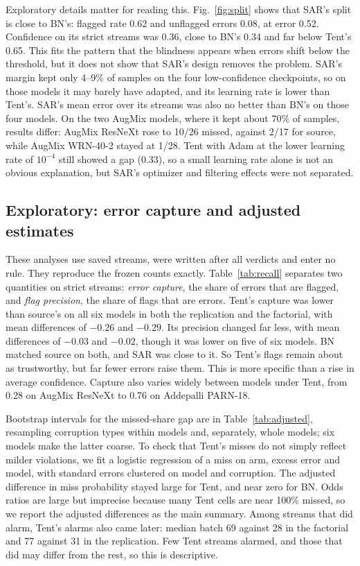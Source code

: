 \documentclass[runningheads]{llncs}
\begin{document}
Exploratory details matter for reading this. Fig.~\ref{fig:split} shows that SAR's split is close to BN's: flagged rate 0.62 and unflagged errors 0.08, at error 0.52. Confidence on its strict streams was 0.36, close to BN's 0.34 and far below Tent's 0.65. This fits the pattern that the blindness appears when errors shift below the threshold, but it does not show that SAR's design removes the problem. SAR's margin kept only 4--9\% of samples on the four low-confidence checkpoints, so on those models it may barely have adapted, and its learning rate is lower than Tent's. SAR's mean error over its streams was also no better than BN's on those four models. On the two AugMix models, where it kept about 70\% of samples, results differ: AugMix ResNeXt rose to 10/26 missed, against 2/17 for source, while AugMix WRN-40-2 stayed at 1/28. Tent with Adam at the lower learning rate of $10^{-4}$ still showed a gap (0.33), so a small learning rate alone is not an obvious explanation, but SAR's optimizer and filtering effects were not separated.

\subsection{Exploratory: error capture and adjusted estimates}
These analyses use saved streams, were written after all verdicts and enter no rule. They reproduce the frozen counts exactly. Table~\ref{tab:recall} separates two quantities on strict streams: \emph{error capture}, the share of errors that are flagged, and \emph{flag precision}, the share of flags that are errors. Tent's capture was lower than source's on all six models in both the replication and the factorial, with mean differences of $-0.26$ and $-0.29$. Its precision changed far less, with mean differences of $-0.03$ and $-0.02$, though it was lower on five of six models. BN matched source on both, and SAR was close to it. So Tent's flags remain about as trustworthy, but far fewer errors raise them. This is more specific than a rise in average confidence. Capture also varies widely between models under Tent, from 0.28 on AugMix ResNeXt to 0.76 on Addepalli PARN-18.

Bootstrap intervals for the missed-share gap are in Table~\ref{tab:adjusted}, resampling corruption types within models and, separately, whole models; six models make the latter coarse. To check that Tent's misses do not simply reflect milder violations, we fit a logistic regression of a miss on arm, excess error and model, with standard errors clustered on model and corruption. The adjusted difference in miss probability stayed large for Tent, and near zero for BN. Odds ratios are large but imprecise because many Tent cells are near 100\% missed, so we report the adjusted differences as the main summary. Among streams that did alarm, Tent's alarms also came later: median batch 69 against 28 in the factorial and 77 against 31 in the replication. Few Tent streams alarmed, and those that did may differ from the rest, so this is descriptive.
\end{document}
